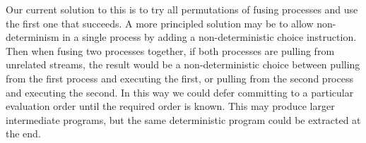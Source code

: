 % 

Our current solution to this is to try all permutations of fusing processes and use the first one that succeeds.
A more principled solution may be to allow non-determinism in a single process by adding a non-deterministic choice instruction.
Then when fusing two processes together, if both processes are pulling from unrelated streams, the result would be a non-deterministic choice between pulling from the first process and executing the first, or pulling from the second process and executing the second.
In this way we could defer committing to a particular evaluation order until the required order is known.
This may produce larger intermediate programs, but the same deterministic program could be extracted at the end.

